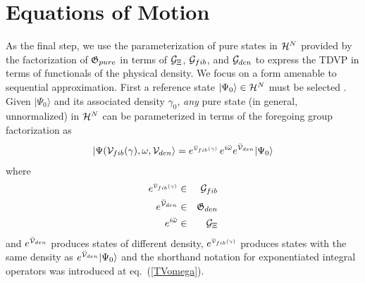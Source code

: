 \section{Equations of Motion}

As the final step, we use the parameterization of pure states in ${\cal H}%
^{N}$ provided by the factorization of ${\frak G}_{pure}$ in terms of ${\cal %
G}_{\Xi }$, ${\cal G}_{fib}$, and ${\cal G}_{den}$ to express the TDVP in
terms of functionals of the physical density. We focus on a form amenable to
sequential approximation. First a reference state $|\Psi _{0}\rangle \in 
{\cal H}^{N}$ must be selected \cite{RefState}. Given $|\Psi _{0}\rangle $
and its associated density $\gamma _{0}$, {\em any} pure state (in general,
unnormalized) in ${\cal H}^{N}$ can be parameterized in terms of the
foregoing group factorization as 
\begin{equation}
|\Psi ({\cal V}_{fib}(\gamma ),\omega ,{\cal V}_{den}\rangle =e^{_{{\cal 
\breve{V}}_{fib}(\gamma )}}\,e^{i\breve{\omega}}e^{\breve{{\cal V}}%
_{den}}|\Psi _{0}\rangle  \label{vv1omega1}
\end{equation}%
where 
\begin{eqnarray}
e^{_{{\cal \breve{V}}_{fib}(\gamma )}} &\in &{\cal G}_{fib}  \nonumber \\
e^{\breve{{\cal V}}_{den}} &\in &{\frak G}_{den}  \nonumber \\
e^{i\breve{\omega}} &\in &{\cal G}_{\Xi }  \label{vv1omega2}
\end{eqnarray}%
and $e^{\breve{{\cal V}}_{den}}$ produces states of different density, $e^{_{%
{\cal \breve{V}}_{fib}(\gamma )}}$ produces states with the same density as $%
e^{\breve{{\cal V}}_{den}}|\Psi _{0}\rangle $ and the shorthand notation for
exponentiated integral operators was introduced at eq.~(\ref{TVomega}).

